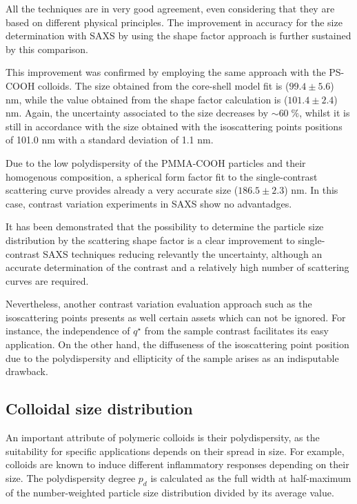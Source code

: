 All the techniques are in very good agreement, even considering that they are based on different physical principles. The improvement in accuracy for the size determination with SAXS by using the shape factor approach is further sustained by this comparison. 

This improvement was confirmed by employing the same approach with the PS-COOH colloids. The size obtained from the core-shell model fit is ($99.4\pm5.6$) nm\citep{garcia-diez_nanoparticle_2015}, while the value obtained from the shape factor calculation is ($101.4\pm2.4$) nm. Again, the uncertainty associated to the size decreases by $\sim 60\;\%$, whilst it is still in accordance with the size obtained with the isoscattering points positions of 101.0 nm with a standard deviation of 1.1 nm. 

Due to the low polydispersity of the PMMA-COOH particles and their homogenous composition, a spherical form factor fit to the single-contrast scattering curve provides already a very accurate size ($186.5\pm2.3$) nm. In this case, contrast variation experiments in SAXS show no advantadges.

It has been demonstrated that the possibility to determine the particle size distribution by the scattering shape factor is a clear improvement to single-contrast SAXS techniques reducing relevantly the uncertainty, although an accurate determination of the contrast and a relatively high number of scattering curves are required. 

Nevertheless, another contrast variation evaluation approach such as the isoscattering points presents as well certain assets which can not be ignored. For instance, the independence of $q^{\star}$ from the sample contrast facilitates its easy application. On the other hand, the diffuseness of the isoscattering point position due to the polydispersity and ellipticity of the sample\citep{kawaguchi_isoscattering_1992} arises as an indisputable drawback.

\subsection{Colloidal size distribution}

An important attribute of polymeric colloids is their polydispersity, as the suitability for specific applications depends on their spread in size. For example, colloids are known to induce different inflammatory responses depending on their size\citep{kusaka_effect_2014}. The polydispersity degree $p_d$ is calculated as the full width at half-maximum of the number-weighted particle size distribution divided by its average value.

